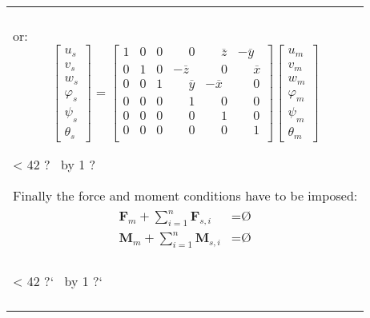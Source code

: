 \documentclass[10pt,b5paper,titlepage]{book}
\newcommand{\m}{\mathbf}
\newcommand{\Null}{\text{\O}}
\newenvironment{bbox}[1][0.96]
{
    \begin{center}
        \begin{tabular}{|p{#1\textwidth}|}
            \hline\\
}
{
            \\\\\hline
        \end{tabular}
    \end{center}
}
\newcommand{\repeatit}[3][10]{%
    \myloopcounter1%
    \loop\ifnum\myloopcounter < #1
    #2#3%
    \advance\myloopcounter by 1%
    \repeat%
    #2%
}
\newenvironment{qbox}
{
\begin{center}
    \repeatit[42]{?}{\ }
\end{center}
}
{
\begin{center}
    \repeatit[42]{?`}{\ }
\end{center}
}
\newenvironment{eqarray}
{
    \begin{eqnarray}
        \begin{aligned}
}
{
        \end{aligned}
    \end{eqnarray}
}
\begin{document}
\begin{bbox}[0.95]
    or:
    \begin{equation}
        \begin{bmatrix}
            u_s \\
            v_s \\
            w_s \\
            \varphi_s \\
            \psi_s \\
            \theta_s
        \end{bmatrix}
        = \begin{bmatrix}
            1 & 0 & 0 & \phantom{-}0 & \phantom{-}\overline{z} & -\overline{y} \\
            0 & 1 & 0 & -\overline{z} & \phantom{-}0 & \phantom{-}\overline{x} \\
            0 & 0 & 1 & \phantom{-}\overline{y} & -\overline{x} & \phantom{-}0 \\
            0 & 0 & 0 & \phantom{-}1 & \phantom{-}0 & \phantom{-}0 \\
            0 & 0 & 0 & \phantom{-}0 & \phantom{-}1 & \phantom{-}0 \\
            0 & 0 & 0 & \phantom{-}0 & \phantom{-}0 & \phantom{-}1 \\
        \end{bmatrix}
        \begin{bmatrix}
            u_m \\
            v_m \\
            w_m \\
            \varphi_m \\
            \psi_m \\
            \theta_m
        \end{bmatrix}
    \end{equation}

    \begin{qbox}
        Finally the force and moment conditions have to be imposed:
        \begin{eqarray}
            \m{F}_m + \sum_{i=1}^n \m{F}_{s,i} &= \Null \\
            \m{M}_m + \sum_{i=1}^n \m{M}_{s,i} &= \Null \\
        \end{eqarray}


\end{qbox}
\end{bbox}
\end{document}

